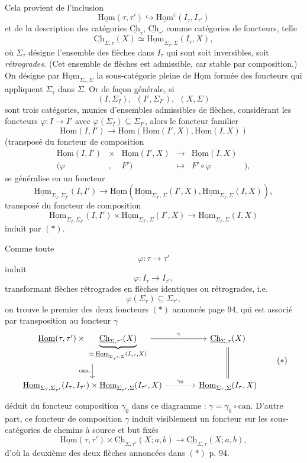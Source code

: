 \documentclass[11pt]{article}
\newcommand{\printedpage}[1]{\marginpar{\footnotesize p.~#1}}
\newcommand{\msp}[1]{\marginpar{\vspace*{10pt}\footnotesize [#1]}}
\newcommand{\uHom}{\underline{\mathrm{Hom}}}
\newcommand{\uCh}{\underline{\mathrm{Ch}}}
\begin{document}
Cela provient de l'inclusion
\[
\uHom(\tau,\tau')\hookrightarrow\uHom^{\varepsilon}(I_\tau,I_{\tau'})
\]
et de la description des catégories $\uCh_\tau$, $\uCh_{\tau'}$ comme catégories de foncteurs, telle
\[
\uCh_{\Sigma,\tau}(X)\simeq\uHom_{\Sigma_\tau,\Sigma}(I_\tau,X),
\]
où $\Sigma_\tau$ désigne l'ensemble des flèches dans $I_\tau$ qui sont soit inversibles, soit \textit{rétrogrades.} (Cet ensemble de flèches est admissible, car stable par composition.) On désigne par $\uHom_{\Sigma_\tau,\Sigma}$ la sous-catégorie pleine de $\uHom$ formée des foncteurs qui appliquent $\Sigma_\tau$ dans $\Sigma$. Or de façon générale, si
\[
(I,\Sigma_I),\ \ (I',\Sigma_{I'}),\ \ (X,\Sigma)
\]
sont trois catégories, munies d'ensembles admissibles de flèches, considérant les foncteurs $\varphi:I\longrightarrow I'$ avec $\varphi(\Sigma_I)\subseteq\Sigma_{I'}$, alors le foncteur familier
\[
\uHom(I,I')\longrightarrow\uHom(\uHom(I',X),\uHom(I,X))
\]
(transposé du foncteur de composition
\[
\begin{matrix}
\uHom(I,I') & \times & \uHom(I',X) & \longrightarrow & \uHom(I,X) & \\
(\varphi & , & F') & \longmapsto & F'\circ\varphi & ),
\end{matrix}
\]
se généralise en un foncteur
\[
\uHom_{\Sigma_I,\Sigma_{I'}}(I,I')\longrightarrow\uHom(\uHom_{\Sigma_{I'},\Sigma}(I',X),\uHom_{\Sigma_I,\Sigma}(I,X)),
\tag*{$(*)$}
\]
transposé du foncteur de composition
\[
\uHom_{\Sigma_I,\Sigma_{I'}}(I,I')\times\uHom_{\Sigma_{I'},\Sigma}(I',X)\longrightarrow\uHom_{\Sigma_I,\Sigma}(I,X)
\]
induit par $(*)$.

\msp{page 96}

Comme toute
\[
\varphi:\tau\longrightarrow\tau'
\]
induit
\[
\varphi:I_\tau\longrightarrow I_{\tau'},
\]
transformant flèches rétrogrades en flèches identiques ou rétrogrades, i.e.
\[
\varphi(\Sigma_\tau)\subseteq\Sigma_{\tau'},
\]
\printedpage{62}
on trouve le premier des deux foncteurs $(*)$ annoncés page 94, qui est associé par transposition au foncteur $\gamma$
\[
\begin{tikzcd}[column sep=large]
\uHom(\tau,\tau')\times\ \underbrace{\uCh_{\Sigma,\tau'}(X)}_{\simeq\,\uHom_{\Sigma_{\tau'},\Sigma}(I_{\tau'},X)} \arrow[r, "\gamma"] \arrow[d, "\text{can.}"'] & \uCh_{\Sigma,\tau}(X) \arrow[d, equal]\\
\uHom_{\Sigma_\tau,\Sigma_{\tau'}}(I_\tau,I_{\tau'})\times\uHom_{\Sigma_{\tau'},\Sigma}(I_{\tau'},X) \arrow[r, dotted, "\gamma_0"] & \uHom_{\Sigma_\tau,\Sigma}(I_\tau,X)
\end{tikzcd}
\tag*{$(*)$}
\]
déduit du foncteur composition $\gamma_0$ dans ce diagramme : $\gamma=\gamma_0\circ\mathrm{can}.$ D'autre part, ce foncteur de composition $\gamma$ induit visiblement un foncteur sur les sous-catégories de chemins à source et but fixés
\[
\uHom(\tau,\tau')\times\uCh_{\Sigma,\tau'}(X;a,b)\longrightarrow\uCh_{\Sigma,\tau}(X;a,b),
\]
d'où la deuxième des deux flèches annoncées dans $(*)$ p. 94.
\end{document}

